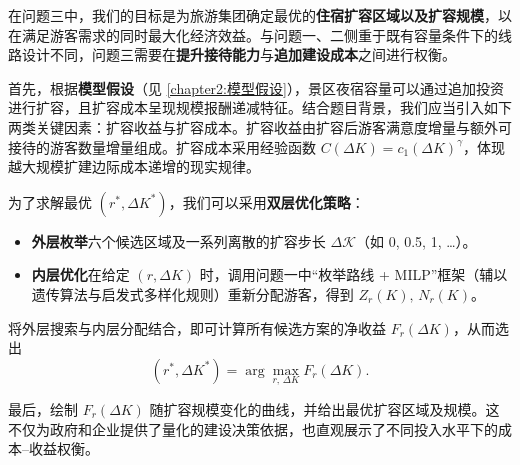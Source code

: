 在问题三中，我们的目标是为旅游集团确定最优的\textbf{住宿扩容区域以及扩容规模}，以在满足游客需求的同时最大化经济效益。与问题一、二侧重于既有容量条件下的线路设计不同，问题三需要在\textbf{提升接待能力}与\textbf{追加建设成本}之间进行权衡。

首先，根据\textbf{模型假设}（见 \ref{chapter2:模型假设}），景区夜宿容量可以通过追加投资进行扩容，且扩容成本呈现规模报酬递减特征。结合题目背景，我们应当引入如下两类关键因素：扩容收益与扩容成本。扩容收益由扩容后游客满意度增量与额外可接待的游客数量增量组成。扩容成本采用经验函数 $C(\Delta K)=c_{1}(\Delta K)^{\gamma}$，体现越大规模扩建边际成本递增的现实规律。




为了求解最优 $(r^{*},\Delta K^{*})$，我们可以采用\textbf{双层优化策略}：

\begin{itemize}
  \item \textbf{外层枚举}\;六个候选区域及一系列离散的扩容步长 $\Delta\mathcal K$（如 0, 0.5, 1, \dots）。
  \item \textbf{内层优化}\;在给定 $(r,\Delta K)$ 时，调用问题一中“枚举路线 + MILP”框架（辅以遗传算法与启发式多样化规则）重新分配游客，得到 $Z_r(K),\,N_r(K)$。
\end{itemize}

将外层搜索与内层分配结合，即可计算所有候选方案的净收益 $F_r(\Delta K)$，从而选出
\[
  (r^{*},\Delta K^{*})=\arg\max_{r,\,\Delta K} F_r(\Delta K).
\]

最后，绘制 $F_r(\Delta K)$ 随扩容规模变化的曲线，并给出最优扩容区域及规模。这不仅为政府和企业提供了量化的建设决策依据，也直观展示了不同投入水平下的成本–收益权衡。



